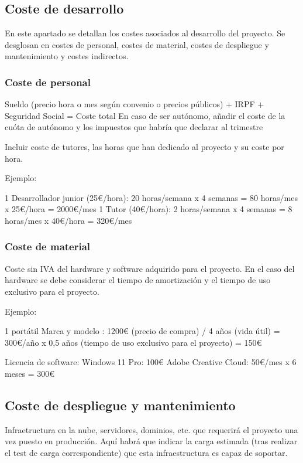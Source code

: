 \subsection{Coste de desarrollo}

En este apartado se detallan los costes asociados al desarrollo del proyecto. Se desglosan en costes de personal, costes de material, costes de despliegue y mantenimiento y costes indirectos.

\subsubsection{Coste de personal}

Sueldo (precio hora o mes según convenio o precios públicos) + IRPF + Seguridad Social = Coste total
En caso de ser autónomo, añadir el coste de la cuóta de autónomo y los impuestos que habría que declarar al trimestre

Incluir coste de tutores, las horas que han dedicado al proyecto y su coste por hora. 

Ejemplo:

1 Desarrollador junior (25€/hora): 20 horas/semana x 4 semanas = 80 horas/mes x 25€/hora = 2000€/mes 
1 Tutor (40€/hora): 2 horas/semana x 4 semanas = 8 horas/mes x 40€/hora = 320€/mes 

\subsubsection{Coste de material}

Coste sin IVA del hardware y software adquirido para el proyecto.
En el caso del hardware se debe considerar el tiempo de amortización y el tiempo de uso exclusivo para el proyecto.

Ejemplo:

1 portátil Marca y modelo : 1200€ (precio de compra) / 4 años (vida útil) = 300€/año x 0,5 años (tiempo de uso exclusivo para el proyecto) = 150€

Licencia de software: 
Windows 11 Pro: 100€
Adobe Creative Cloud: 50€/mes x 6 meses = 300€


\subsection{Coste de despliegue y mantenimiento}

Infraetructura en la nube, servidores, dominios, etc. que requerirá el proyecto una vez puesto en producción. Aquí habrá que indicar la carga estimada (tras realizar el test de carga correspondiente) que esta infraestructura es capaz de soportar.

